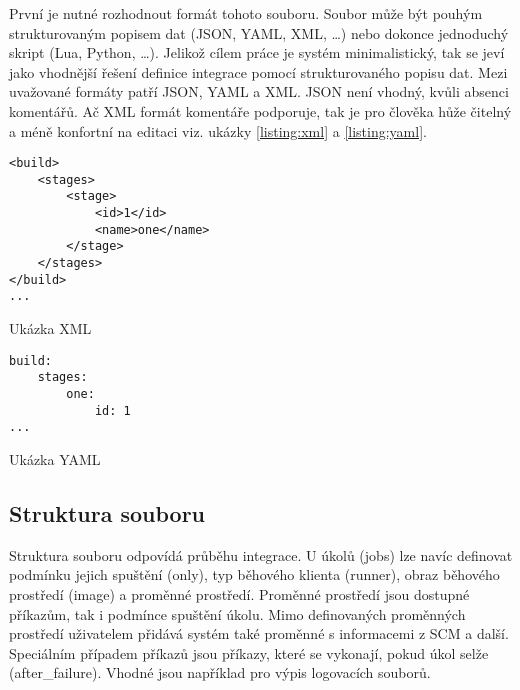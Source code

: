 První je nutné rozhodnout formát tohoto souboru.
Soubor může být pouhým strukturovaným popisem dat (JSON, YAML, XML, \ldots) nebo dokonce jednoduchý skript (Lua, Python, \ldots).
Jelikož cílem práce je systém minimalistický, tak se jeví jako vhodnější řešení definice integrace pomocí strukturovaného popisu dat.
Mezi uvažované formáty patří JSON, YAML a XML.
JSON není vhodný, kvůli absenci komentářů.
Ač XML formát komentáře podporuje, tak je pro člověka hůže čitelný a méně konfortní na editaci viz. ukázky \ref{listing:xml} a \ref{listing:yaml}.

\begin{listing}[ht]
\begin{verbatim}
<build>
    <stages>
        <stage>
            <id>1</id>
            <name>one</name>
        </stage>
    </stages>
</build>
...
\end{verbatim}
\caption{Ukázka XML}
\label{listing:xml}
\end{listing}

\begin{listing}[ht]
\begin{verbatim}
build:
    stages:
        one:
            id: 1
...
\end{verbatim}
\caption{Ukázka YAML}
\label{listing:yaml}
\end{listing}

\subsection{Struktura souboru}

Struktura souboru odpovídá průběhu integrace.
U úkolů (jobs) lze navíc definovat podmínku jejich spuštění (only), typ běhového klienta (runner), obraz běhového prostředí (image) a proměnné prostředí.
Proměnné prostředí jsou dostupné příkazům, tak i podmínce spuštění úkolu.
Mimo definovaných proměnných prostředí uživatelem přidává systém také proměnné s informacemi z SCM a další.
Speciálním případem příkazů jsou příkazy, které se vykonají, pokud úkol selže (after\_failure).
Vhodné jsou například pro výpis logovacích souborů.


